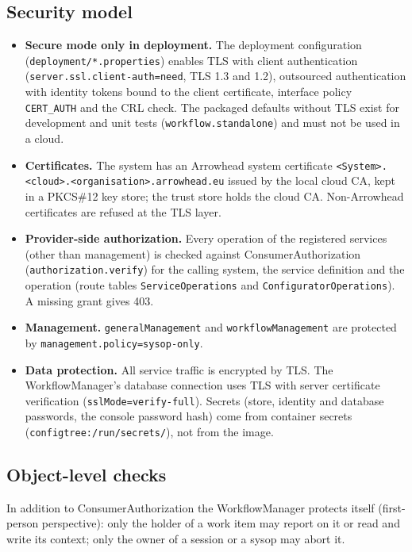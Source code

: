 \documentclass[a4paper]{arrowhead}
\begin{document}
\subsection{Security model}
\begin{itemize}
\item \textbf{Secure mode only in deployment.} The deployment configuration (\texttt{deployment/*.properties}) enables
TLS with client authentication (\texttt{server.ssl.client-auth=need}, TLS 1.3 and 1.2), outsourced authentication with
identity tokens bound to the client certificate, interface policy \texttt{CERT\_AUTH} and the CRL check. The packaged
defaults without TLS exist for development and unit tests (\texttt{workflow.standalone}) and must not be used in a
cloud.
\item \textbf{Certificates.} The system has an Arrowhead system certificate
\texttt{<System>.<cloud>.<organisation>.arrowhead.eu} issued by the local cloud CA, kept in a PKCS\#12 key store; the
trust store holds the cloud CA. Non-Arrowhead certificates are refused at the TLS layer.
\item \textbf{Provider-side authorization.} Every operation of the registered services (other than management) is
checked against ConsumerAuthorization (\texttt{authorization.verify}) for the calling system, the service definition
and the operation (route tables \texttt{ServiceOperations} and \texttt{ConfiguratorOperations}). A missing grant gives
403.
\item \textbf{Management.} \texttt{generalManagement} and \texttt{workflowManagement} are protected by
\texttt{management.policy=sysop-only}.
\item \textbf{Data protection.} All service traffic is encrypted by TLS. The WorkflowManager's database connection uses
TLS with server certificate verification (\texttt{sslMode=verify-full}). Secrets (store, identity and database
passwords, the console password hash) come from container secrets (\texttt{configtree:/run/secrets/}), not from the
image.
\end{itemize}


\subsection{Object-level checks}
In addition to ConsumerAuthorization the WorkflowManager protects itself (first-person perspective): only the holder of
a work item may report on it or read and write its context; only the owner of a session or a sysop may abort it.
\end{document}
